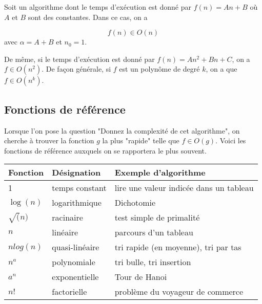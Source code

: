 \documentclass{../cours}
\begin{document}
\begin{Example}

Soit un algorithme dont le temps d'exécution est donné par $f(n) = An+B$ où $A$ et $B$ sont des constantes. Dans ce cas, on a

\begin{equation}
f(n) \in O(n)
\end{equation}
avec $\alpha = A +B$ et $n_0 = 1$.

De même, si le temps d'exécution est donné par $f(n) = An^2 + Bn + C$, on a $f \in O(n^2)$. De façon générale, si $f$ est un polynôme de degré $k$, on a que $f \in O(n^k)$.

\end{Example}

\subsection{Fonctions de référence}

Lorsque l'on pose la question "Donnez la complexité de cet algorithme", on cherche à trouver la fonction $g$ la plus "rapide" telle que $f \in O(g)$. Voici les fonctions de référence auxquels on se rapportera le plus souvent.

\begin{tabular}{|l|l|l|}
\hline
Fonction & Désignation & Exemple d'algorithme
\\
\hline \hline
1 & temps constant & lire une valeur indicée dans un tableau \\  \hline
$\log(n)$ & logarithmique & Dichotomie \\ \hline
$\sqrt(n)$ & racinaire & test simple de primalité \\
\hline \hline
$n$ & linéaire & parcours d'un tableau \\ 
\hline \hline
$n log(n)$ & quasi-linéaire & tri rapide (en moyenne), tri par tas \\ \hline
$n^a$ & polynomiale & tri bulle, tri insertion \\ 
\hline \hline
$a^n$ & exponentielle & Tour de Hanoi \\ \hline
$n!$ & factorielle & problème du voyageur de commerce \\  \hline

\end{tabular}
\end{document}
